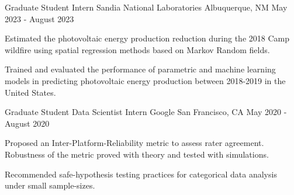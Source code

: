 

\begin{cventries}

    \cventry
    {Graduate Student Intern} %
    {Sandia National Laboratories} %
    {Albuquerque, NM} %
    {May 2023 - August 2023} %
    {
      \begin{cvitems} %
        \item Estimated the photovoltaic energy production reduction during the 2018 Camp wildfire using spatial regression methods \newline based on Markov Random fields. 
        \item Trained and evaluated the performance of parametric and machine learning models in predicting photovoltaic \newline energy production between 2018-2019 in the United States.
      \end{cvitems}
    }
    
  \cventry
    {Graduate Student Data Scientist Intern} %
    {Google} %
    {San Francisco, CA} %
    {May 2020 - August 2020} %
    {
      \begin{cvitems} %
\item Proposed an Inter-Platform-Reliability metric to assess rater agreement. Robustness of the metric proved with theory \newline and tested with simulations.
\item Recommended safe-hypothesis testing practices for categorical data analysis under small sample-sizes.
      \end{cvitems}
    }

\end{cventries}
